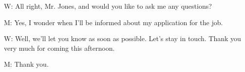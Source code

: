 \documentclass[12pt]{article}
\begin{document}
\vspace{0.00mm}

\vspace{0.00mm}
\setlength{\parindent}{0.00mm}
\setlength{\leftskip}{-6.23mm}
\setlength{\rightskip}{0.00mm}

W: All right, Mr. Jones, and would you like to ask me any questions?
\vspace{0.00mm}

\vspace{0.00mm}
\setlength{\parindent}{0.00mm}
\setlength{\leftskip}{-6.23mm}
\setlength{\rightskip}{0.00mm}


\vspace{0.00mm}

\vspace{0.00mm}
\setlength{\parindent}{0.00mm}
\setlength{\leftskip}{-6.23mm}
\setlength{\rightskip}{0.00mm}

M: Yes, I wonder when I'll be informed about my application for the job.
\vspace{0.00mm}

\vspace{0.00mm}
\setlength{\parindent}{0.00mm}
\setlength{\leftskip}{-6.23mm}
\setlength{\rightskip}{0.00mm}


\vspace{0.00mm}

\vspace{0.00mm}
\setlength{\parindent}{0.00mm}
\setlength{\leftskip}{-6.23mm}
\setlength{\rightskip}{0.00mm}

W: Well, we'll let you know as soon as possible. Let's stay in touch. Thank you very much for coming this afternoon.
\vspace{0.00mm}

\vspace{0.00mm}
\setlength{\parindent}{0.00mm}
\setlength{\leftskip}{-6.23mm}
\setlength{\rightskip}{0.00mm}


\vspace{0.00mm}

\vspace{0.00mm}
\setlength{\parindent}{0.00mm}
\setlength{\leftskip}{-6.23mm}
\setlength{\rightskip}{0.00mm}

M: Thank you.
\vspace{0.00mm}

\vspace{0.00mm}
\setlength{\parindent}{0.00mm}
\setlength{\leftskip}{-6.23mm}
\setlength{\rightskip}{0.00mm}


\vspace{0.00mm}
\end{document}
